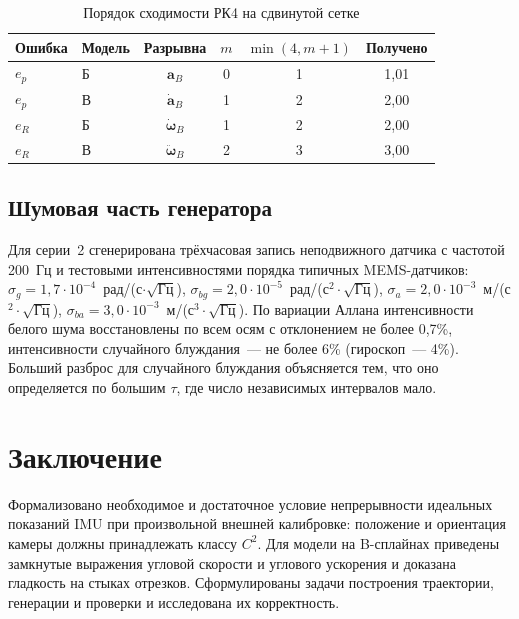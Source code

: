 \documentclass{misisarticle}
\newcommand{\vb}[1]{\mathbf{#1}}
\begin{document}
\begin{table}[!tb]
  \caption{Порядок сходимости РК4 на сдвинутой сетке}
  \label{tab:orders}
  \centering
  \small
  \begin{tabular}{llcccc}
    \toprule
    Ошибка & Модель & Разрывна & $m$ & $\min(4,m+1)$ & Получено \\
    \midrule
    $e_p$ & Б & $\vb a_B$ & 0 & 1 & 1,01 \\
    $e_p$ & В & $\dot{\vb a}_B$ & 1 & 2 & 2,00 \\
    $e_R$ & Б & $\dot{\boldsymbol\omega}_B$ & 1 & 2 & 2,00 \\
    $e_R$ & В & $\ddot{\boldsymbol\omega}_B$ & 2 & 3 & 3,00 \\
    \bottomrule
  \end{tabular}
\end{table}

\subsection{Шумовая часть генератора}

Для серии~2 сгенерирована трёхчасовая запись неподвижного датчика с частотой 200~Гц и тестовыми интенсивностями порядка типичных MEMS-датчиков: $\sigma_g=1{,}7\cdot10^{-4}$~рад/(с$\cdot\sqrt{\text{Гц}}$), $\sigma_{bg}=2{,}0\cdot10^{-5}$~рад/(с$^2\cdot\sqrt{\text{Гц}}$), $\sigma_a=2{,}0\cdot10^{-3}$~м/(с$^2\cdot\sqrt{\text{Гц}}$), $\sigma_{ba}=3{,}0\cdot10^{-3}$~м/(с$^3\cdot\sqrt{\text{Гц}}$). По вариации Аллана интенсивности белого шума восстановлены по всем осям с отклонением не более 0,7\%, интенсивности случайного блуждания~--- не более 6\% (гироскоп~--- 4\%). Больший разброс для случайного блуждания объясняется тем, что оно определяется по большим $\tau$, где число независимых интервалов мало.

\section{Заключение}

Формализовано необходимое и достаточное условие непрерывности идеальных показаний IMU при произвольной внешней калибровке: положение и ориентация камеры должны принадлежать классу $C^2$. Для модели на B-сплайнах приведены замкнутые выражения угловой скорости и углового ускорения и доказана гладкость на стыках отрезков. Сформулированы задачи построения траектории, генерации и проверки и исследована их корректность.
\end{document}
